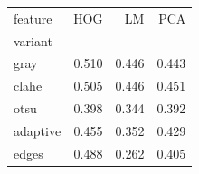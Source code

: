 \begin{tabular}{lrrr}
\toprule
feature & HOG & LM & PCA \\
variant &  &  &  \\
\midrule
gray & 0.510 & 0.446 & 0.443 \\
clahe & 0.505 & 0.446 & 0.451 \\
otsu & 0.398 & 0.344 & 0.392 \\
adaptive & 0.455 & 0.352 & 0.429 \\
edges & 0.488 & 0.262 & 0.405 \\
\bottomrule
\end{tabular}
